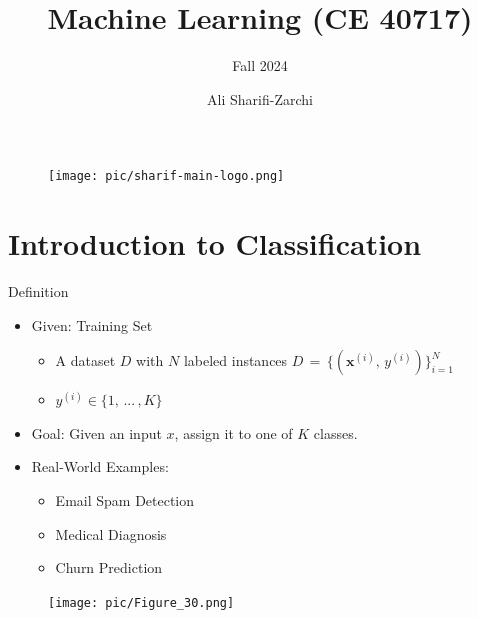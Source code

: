 \documentclass[serif, aspectratio=169]{beamer}
\author{Ali Sharifi-Zarchi}
\title{Machine Learning (CE 40717)}
\subtitle{Fall 2024}
\institute{
    CE Department \\
    Sharif University of Technology
}
\begin{document}
\begin{frame}
    \titlepage
    \vspace*{-0.6cm}
    \begin{figure}[htpb]
        \begin{center}
            \texttt{[image: pic/sharif-main-logo.png]}
        \end{center}
    \end{figure}
\end{frame}

\begin{frame}    
\tableofcontents[sectionstyle=show,
subsectionstyle=show/shaded/hide,
subsubsectionstyle=show/shaded/hide]
\end{frame}

\section{Introduction to Classification}
\begin{frame}{Definition}
    \begin{itemize}\itemsep2em
        \item Given: Training Set
        \begin{itemize}
            \item A dataset \(D\) with \(N\) labeled instances \(D \, = \, \{(\mathbf{x}^{(i)}, \, y^{(i)})\}^N_{i=1}\)
            \item $y^{(i)} \in \{1, \, ... \, , K\}$
        \end{itemize}
    \end{itemize}
    \begin{itemize}
        \item \justifying Goal: Given an input $x$, assign it to one of $K$ classes.
            \item Real-World Examples:
            \begin{itemize}
                \item Email Spam Detection
                \item Medical Diagnosis
                \item Churn Prediction
            \end{itemize}
    \end{itemize}
    \endminipage
    \hfill
    \begin{figure}
            \centering
            \texttt{[image: pic/Figure\_30.png]}
        \end{figure}
    \endminipage
\end{frame}
\end{document}
